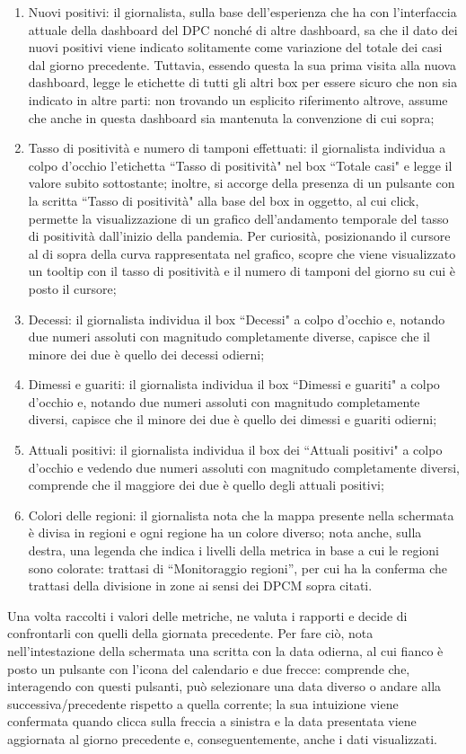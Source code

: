 \begin{enumerate}
    \item Nuovi positivi: il giornalista, sulla base dell'esperienza che ha con l'interfaccia attuale della dashboard del DPC nonché di altre dashboard, sa che il dato dei nuovi positivi viene indicato solitamente come variazione del totale dei casi dal giorno precedente. Tuttavia, essendo questa la sua prima visita alla nuova dashboard, legge le etichette di tutti gli altri box per essere sicuro che non sia indicato in altre parti: non trovando un esplicito riferimento altrove, assume che anche in questa dashboard sia mantenuta la convenzione di cui sopra;
    \item Tasso di positività e numero di tamponi effettuati: il giornalista individua a colpo d'occhio l'etichetta ``Tasso di positività" nel box ``Totale casi" e legge il valore subito sottostante; inoltre, si accorge della presenza di un pulsante con la scritta ``Tasso di positività" alla base del box in oggetto, al cui click, permette la visualizzazione di un grafico dell'andamento temporale del tasso di positività dall'inizio della pandemia. Per curiosità, posizionando il cursore al di sopra della curva rappresentata nel grafico, scopre che viene visualizzato un tooltip con il tasso di positività e il numero di tamponi del giorno su cui è posto il cursore;
    \item Decessi: il giornalista individua il box ``Decessi" a colpo d'occhio e, notando due numeri assoluti con magnitudo completamente diverse, capisce che il minore dei due è quello dei decessi odierni;
    \item Dimessi e guariti: il giornalista individua il box ``Dimessi e guariti" a colpo d'occhio e, notando due numeri assoluti con magnitudo completamente diversi, capisce che il minore dei due è quello dei dimessi e guariti odierni;
    \item Attuali positivi: il giornalista individua il box dei ``Attuali positivi" a colpo d'occhio e vedendo due numeri assoluti con magnitudo completamente diversi, comprende che il maggiore dei due è quello degli attuali positivi;
    \item Colori delle regioni: il giornalista nota che la mappa presente nella schermata è divisa in regioni e ogni regione ha un colore diverso; nota anche, sulla destra, una legenda che indica i livelli della metrica in base a cui le regioni sono colorate: trattasi di ``Monitoraggio regioni'', per cui ha la conferma che trattasi della divisione in zone ai sensi dei DPCM sopra citati. \label{cw1:f}
\end{enumerate}
Una volta raccolti i valori delle metriche, ne valuta i rapporti e decide di confrontarli con quelli della giornata precedente. Per fare ciò, nota nell'intestazione della schermata una scritta con la data odierna, al cui fianco è posto un pulsante con l'icona del calendario e due frecce: comprende che, interagendo con questi pulsanti, può selezionare una data diverso o andare alla successiva/precedente rispetto a quella corrente; la sua intuizione viene confermata quando clicca sulla freccia a sinistra e la data presentata viene aggiornata al giorno precedente e, conseguentemente, anche i dati visualizzati.


